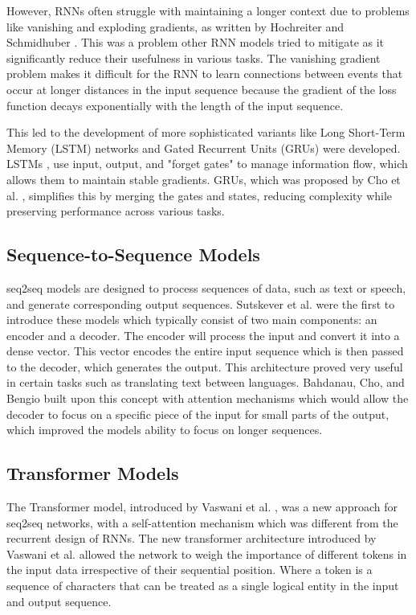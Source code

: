 However, RNNs often struggle with maintaining a longer context due to problems like vanishing and exploding gradients, as written by Hochreiter and Schmidhuber \cite{hochreiter_long_1997}. This was a problem other RNN models tried to mitigate as it significantly reduce their usefulness in various tasks. The vanishing gradient problem makes it difficult for the RNN to learn connections between events that occur at longer distances in the input sequence because the gradient of the loss function decays exponentially with the length of the input sequence.


This led to the development of more sophisticated variants like Long Short-Term Memory (LSTM) networks and Gated Recurrent Units (GRUs) were developed. LSTMs \cite{hochreiter_long_1997}, use input, output, and "forget gates" to manage information flow, which allows them to maintain stable gradients. GRUs, which was proposed by Cho et al. \cite{cho_learning_2014}, simplifies this by merging the gates and states, reducing complexity while preserving performance across various tasks.


\subsection{Sequence-to-Sequence Models}


\gls{seq2seq} models are designed to process sequences of data, such as text or speech, and generate corresponding output sequences. Sutskever et al. \cite{sutskever_sequence_2014} were the first to introduce these models which typically consist of two main components: an encoder and a decoder. The encoder will process the input and convert it into a dense vector. This vector encodes the entire input sequence which is then passed to the decoder, which generates the output. This architecture proved very useful in certain tasks such as translating text between languages. Bahdanau, Cho, and Bengio built upon this concept with attention mechanisms \cite{bahdanau_neural_2016} which would allow the decoder to focus on a specific piece of the input for small parts of the output, which improved the models ability to focus on longer sequences.


\subsection{Transformer Models}


The Transformer model, introduced by Vaswani et al. \cite{vaswani_attention_2023}, was a new approach for \gls{seq2seq} networks, with a self-attention mechanism which was different from the recurrent design of RNNs. The new transformer architecture introduced by Vaswani et al. allowed the network to weigh the importance of different tokens in the input data irrespective of their sequential position. Where a token is a sequence of characters that can be treated as a single logical entity in the input and output sequence.


